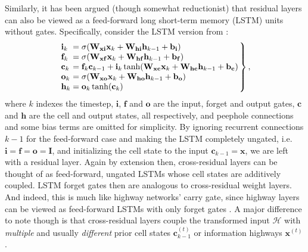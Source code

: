 \documentclass{sig-alternate-05-2015}
\newcommand{\mb}{\mathbf}
\begin{document}
Similarly, it has been argued (though somewhat reductionist) that residual layers can also be viewed as a feed-forward long short-term memory (LSTM) \cite{hochreiter_1997} units without gates.
Specifically, consider the LSTM version from \cite{gers_2002}:
\begin{equation}
 \left.\arraycolsep=1.4pt
 \begin{array}{ll}
  \mb i_k &= \sigma(\mb W_{\mb x\mb i}\mb x_k + \mb W_{\mb h\mb i}\mb h_{k-1} + \mb b_{\mb i}) \\
  \mb f_k &= \sigma(\mb W_{\mb x\mb f}\mb x_k + \mb W_{\mb h\mb f}\mb h_{k-1} + \mb b_{\mb f}) \\
  \mb c_k &= \mb f_k\mb c_{k-1} + \mb i_k\tanh(\mb W_{\mb x\mb c}\mb x_k + \mb W_{\mb h\mb c}\mb h_{k-1} + \mb b_{\mb c}) \\
  \mb o_k &= \sigma(\mb W_{\mb x\mb o}\mb x_k + \mb W_{\mb h\mb o}\mb h_{k-1} + \mb b_{\mb o}) \\
  \mb h_k &= \mb o_k\tanh(\mb c_k)
 \end{array}
 \right\},
 \label{eq:lstm}
\end{equation}
where $k$ indexes the timestep, $\mb i$, $\mb f$ and $\mb o$ are the input, forget and output gates, $\mb c$ and $\mb h$ are the cell and output states, all respectively, and peephole connections and some bias terms are omitted for simplicity.
By ignoring recurrent connections $k-1$ for the feed-forward case and making the LSTM completely ungated, i.e.~$\mb i = \mb f = \mb o = \mb I$, and initializing the cell state to the input $\mb c_{k-1} = \mb x$, we are left with a residual layer.
Again by extension then, cross-residual layers can be thought of as feed-forward, ungated LSTMs whose cell states are additively coupled.
LSTM forget gates then are analogous to cross-residual weight layers.
And indeed, this is much like highway networks' carry gate, since highway layers can be viewed as feed-forward LSTMs with only forget gates \cite{srivastava_2015}.
A major difference to note though is that cross-residual layers couple the transformed input $\mathcal{H}$ with \emph{multiple} and usually \emph{different} prior cell states $\mb c_{k-1}^{(t)}$ or information highways $\mb x^{(t)}$.
\end{document}
